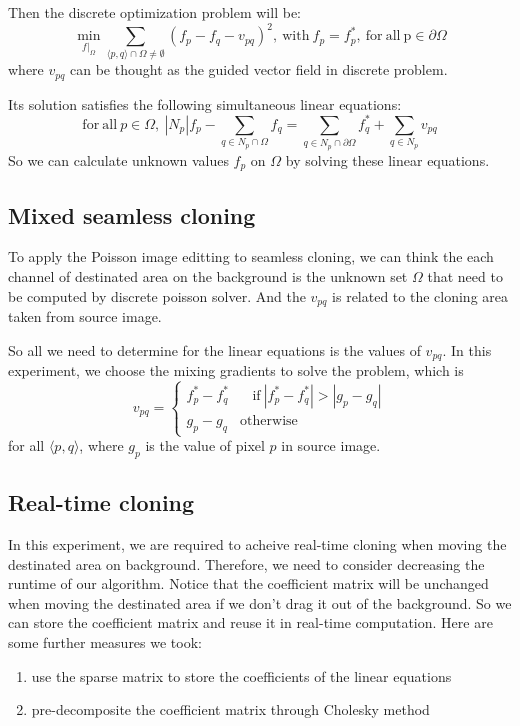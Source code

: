 \documentclass[12pt]{article}
\begin{document}
Then the discrete optimization problem will be:
\begin{equation}
    \min_{f|_\Omega}\sum_{\langle p,q\rangle\cap\Omega\neq\emptyset}(f_p-f_q-v_{pq})^2,\  \mathrm{with}\ f_p=f_p^*,\mathrm{\ for\  all\  p}\in\partial\Omega
\end{equation}
where $v_{pq}$ can be thought as the guided vector field in discrete problem.

Its solution satisfies the following simultaneous linear equations:
\begin{equation}
    \mathrm{for\ all}\ p\in\Omega,\ |N_p|f_p-\sum_{q\in N_p\cap\Omega}f_q=\sum_{q\in N_p\cap\partial\Omega}f_q^*+\sum_{q\in N_p}v_{pq}
\end{equation}
So we can calculate unknown values $f_p$ on $\Omega$ by solving these linear equations.
\subsection{Mixed seamless cloning}
To apply the Poisson image editting to seamless cloning, we can think the each channel of destinated area on the background is the unknown set $\Omega$ that need to be computed by discrete poisson solver. And the $v_{pq}$ is related to the cloning area taken from source image.

So all we need to determine for the linear equations is the values of $v_{pq}$. In this experiment, we choose the mixing gradients to solve the problem, which is
\begin{equation}
    v_{pq}=\left\{
    \begin{array}{cc}
        f^*_p-f^*_q & \ \ \ \ \mathrm{if}\ |f^*_p-f^*_q|>|g_p-g_q| \\
        g_p-g_q     & \mathrm{otherwise}
    \end{array}
    \right.
\end{equation}
for all $\langle p,q\rangle$, where $g_p$ is the value of pixel $p$ in source image.
\subsection{Real-time cloning}
In this experiment, we are required to acheive real-time cloning when moving the destinated area on background. Therefore, we need to consider decreasing the runtime of our algorithm. Notice that the coefficient matrix will be unchanged when moving the destinated area if we don't drag it out of the background. So we can store the coefficient matrix and reuse it in real-time computation. Here are some further measures we took:
\begin{enumerate}
    \item use the sparse matrix to store the coefficients of the linear equations
    \item pre-decomposite the coefficient matrix through Cholesky method
\end{enumerate}
\end{document}

